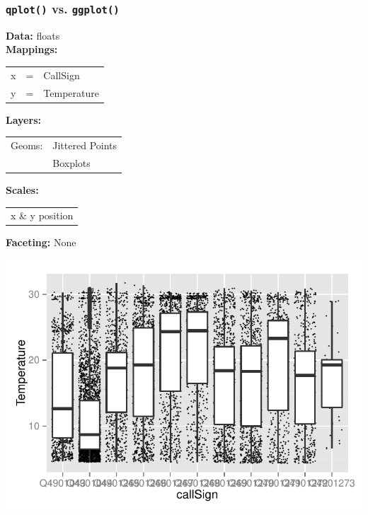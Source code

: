 \documentclass{beamer}\usepackage[]{graphicx}\usepackage[]{color}
\begin{document}
\begin{frame}[fragile]
\frametitle{\texttt{qplot()} vs. \texttt{ggplot()}}
\begin{minipage}{.37\linewidth}
\textbf{Data:} floats \\
\textbf{Mappings:}
\footnotesize

\begin{tabular}{rcl}
x&=&CallSign \\
y&=&Temperature\\
\end{tabular}\normalsize

\textbf{Layers:} 
\footnotesize

\begin{tabular}{rl}
Geoms: & Jittered Points\\
& Boxplots
\end{tabular}
\normalsize

\textbf{Scales:} 
\footnotesize

\begin{tabular}{l}
x \& y position
\end{tabular}
\normalsize

\textbf{Faceting:} None
\end{minipage}
\begin{minipage}{.6\linewidth}\centering
\includegraphics[keepaspectratio=TRUE,width=.92\linewidth]{figure/qvsgg2}
\end{minipage}
\end{frame}

\end{document}
